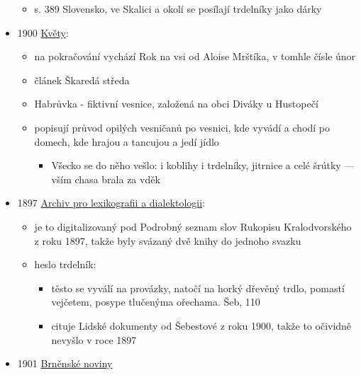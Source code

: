 \begin{itemize}
  \begin{itemize}
  \tightlist
  \item
    s. 389 Slovensko, ve Skalici a okolí se posílají trdelníky jako
    dárky
  \end{itemize}
\item
  1900
  \href{https://ceskadigitalniknihovna.cz/uuid/uuid:24bda940-8ab0-11ed-8f7f-5ef3fc9bb22f}{Květy}:

  \begin{itemize}
  \tightlist
  \item
    na pokračování vychází Rok na vsi od Aloise Mrštíka, v tomhle čísle
    únor
  \item
    článek Škaredá středa
  \item
    Habrůvka - fiktivní vesnice, založená na obci Diváky u Hustopečí
  \item
    popisují průvod opilých vesničanů po vesnici, kde vyvádí a chodí po
    domech, kde hrajou a tancujou a jedí jídlo

    \begin{itemize}
    \tightlist
    \item
      Všecko se do něho vešlo: i koblihy i trdelníky, jitrnice a celé
      šrútky --- vším chasa brala za vděk
    \end{itemize}
  \end{itemize}
\item
  1897
  \href{https://ceskadigitalniknihovna.cz/uuid/uuid:225c96bf-3ac7-4d81-addb-3ab9562be388}{Archiv
  pro lexikografii a dialektologii}:

  \begin{itemize}
  \tightlist
  \item
    je to digitalizovaný pod Podrobný seznam slov Rukopisu
    Kralodvorského z roku 1897, takže byly svázaný dvě knihy do jednoho
    svazku
  \item
    heslo trdelník:

    \begin{itemize}
    \tightlist
    \item
      těsto se vyválí na provázky, natočí na horký dřevěný trdlo,
      pomastí vejčetem, posype tlučenýma ořechama. Šeb, 110
    \item
      cituje Lidské dokumenty od Šebestové z roku 1900, takže to
      očividně nevyšlo v roce 1897
    \end{itemize}
  \end{itemize}
\item
  1901
  \href{https://ndk.cz/view/uuid:c714e5a0-81eb-11e3-a70e-005056822549?page=uuid\%3A884b7690-8641-11e3-b315-001018b5eb5c&fulltext=trdeln\%C3\%ADky}{Brněnské
  noviny}


\end{itemize}

